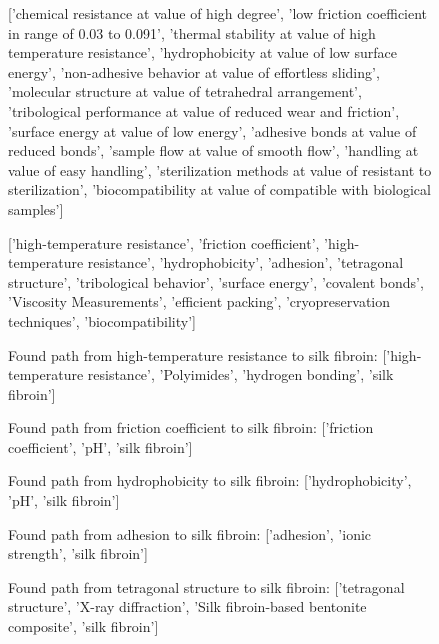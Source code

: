 \begin{figure}[htbp]
  \begin{mdframed}[
    frametitle={Creative GraphWeave Agent Using Breadth-First Search (BFS) with Semantic Stop at 'Silk'},
    frametitlefont=\bfseries\sffamily\small,
    backgroundcolor=white,
    linecolor=black,
    linewidth=0.5pt,
    innerleftmargin=6pt,
    innerrightmargin=6pt,
    innertopmargin=6pt,
    innerbottommargin=6pt
  ]
    \ttfamily\scriptsize
    
    \textbf{}
    
    ['chemical resistance at value of high degree', 'low friction coefficient in range of 0.03 to 0.091', 'thermal stability at value of high temperature resistance', 'hydrophobicity at value of low surface energy', 'non-adhesive behavior at value of effortless sliding', 'molecular structure at value of tetrahedral arrangement', 'tribological performance at value of reduced wear and friction', 'surface energy at value of low energy', 'adhesive bonds at value of reduced bonds', 'sample flow at value of smooth flow', 'handling at value of easy handling', 'sterilization methods at value of resistant to sterilization', 'biocompatibility at value of compatible with biological samples']
    
    \textbf{}
    
    ['high-temperature resistance', 'friction coefficient', 'high-temperature resistance', 'hydrophobicity', 'adhesion', 'tetragonal structure', 'tribological behavior', 'surface energy', 'covalent bonds', 'Viscosity Measurements', 'efficient packing', 'cryopreservation techniques', 'biocompatibility']
    
    \textbf{}
    
    Found path from high-temperature resistance to silk fibroin: ['high-temperature resistance', 'Polyimides', 'hydrogen bonding', 'silk fibroin']
    
    Found path from friction coefficient to silk fibroin: ['friction coefficient', 'pH', 'silk fibroin']
    
    Found path from hydrophobicity to silk fibroin: ['hydrophobicity', 'pH', 'silk fibroin']
    
    Found path from adhesion to silk fibroin: ['adhesion', 'ionic strength', 'silk fibroin']
    
    Found path from tetragonal structure to silk fibroin: ['tetragonal structure', 'X-ray diffraction', 'Silk fibroin-based bentonite composite', 'silk fibroin']
    

\end{mdframed}
\end{figure}
